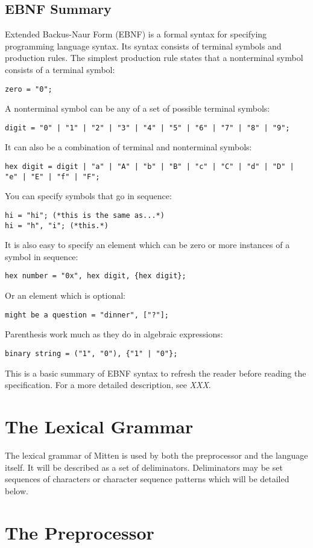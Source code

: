 \documentclass[10pt,a4paper]{article}
\begin{document}
\subsection{EBNF Summary}
\label{sec:EBNFSummary}
Extended Backus-Naur Form (EBNF) is a formal syntax for specifying programming language syntax. Its syntax consists of terminal symbols and production rules. The simplest production rule states that a nonterminal symbol consists of a terminal symbol:
\begin{verbatim}
zero = "0";
\end{verbatim}

A nonterminal symbol can be any of a set of possible terminal symbols:
\begin{verbatim}
digit = "0" | "1" | "2" | "3" | "4" | "5" | "6" | "7" | "8" | "9";
\end{verbatim}

It can also be a combination of terminal and nonterminal symbols:
\begin{verbatim}
hex digit = digit | "a" | "A" | "b" | "B" | "c" | "C" | "d" | "D" | "e" | "E" | "f" | "F";
\end{verbatim}

You can specify symbols that go in sequence:
\begin{verbatim}
hi = "hi"; (*this is the same as...*)
hi = "h", "i"; (*this.*)
\end{verbatim}

It is also easy to specify an element which can be zero or more instances of a symbol in sequence:
\begin{verbatim}
hex number = "0x", hex digit, {hex digit};
\end{verbatim}

Or an element which is optional:
\begin{verbatim}
might be a question = "dinner", ["?"];
\end{verbatim}

Parenthesis work much as they do in algebraic expressions:
\begin{verbatim}
binary string = ("1", "0"), {"1" | "0"};
\end{verbatim}

This is a basic summary of EBNF syntax to refresh the reader before reading the specification. For a more detailed description, see \textit{XXX}.

\section{The Lexical Grammar}
The lexical grammar of Mitten is used by both the preprocessor and the language itself. It will be described as a set of deliminators. Deliminators may be set sequences of characters or character sequence patterns which will be detailed below.



\section{The Preprocessor}
\end{document}
